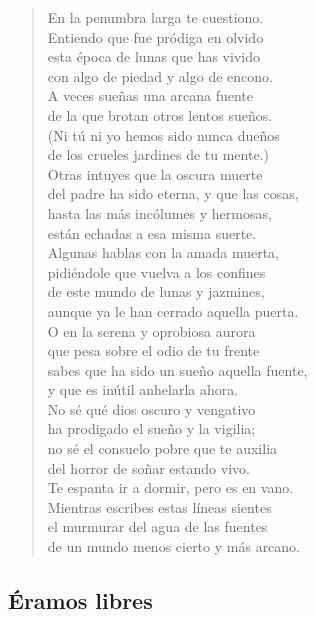 \documentclass[a4paper, 12pt]{article}
\begin{document}
\begin{verse}
    
En la penumbra larga te cuestiono.\\
Entiendo que fue pródiga en olvido\\
esta época de lunas que has vivido\\
con algo de piedad y algo de encono.\\
A veces sueñas una arcana fuente\\
de la que brotan otros lentos sueños.\\
(Ni tú ni yo hemos sido nunca dueños\\
de los crueles jardines de tu mente.)\\
Otras intuyes que la oscura muerte\\
del padre ha sido eterna, y que las cosas,\\
hasta las más incólumes y hermosas,\\
están echadas a esa misma suerte.\\
Algunas hablas con la amada muerta,\\
pidiéndole que vuelva a los confines\\
de este mundo de lunas y jazmines,\\
aunque ya le han cerrado aquella puerta.\\
O en la serena y oprobiosa aurora\\
que pesa sobre el odio de tu frente\\
sabes que ha sido un sueño aquella fuente,\\
y que es inútil anhelarla ahora.\\
No sé qué dios oscuro y vengativo\\
ha prodigado el sueño y la vigilia;\\
no sé el consuelo pobre que te auxilia\\
del horror de soñar estando vivo.\\
Te espanta ir a dormir, pero es en vano.\\
Mientras escribes estas líneas sientes\\
el murmurar del agua de las fuentes\\
de un mundo menos cierto y más arcano.\\
\end{verse}

\pagebreak 
\subsection{Éramos libres}
~
\end{document}
